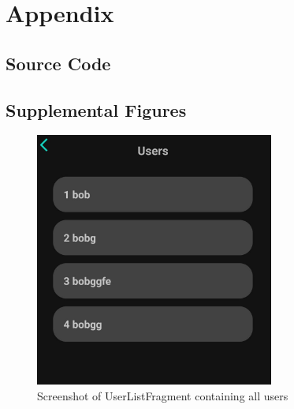 \appendix


\chapter{Appendix}


\section{Source Code}

\section{Supplemental Figures}
\begin{figure}[H]
    \centering
    \includegraphics[width=0.7\textwidth]{images/userlistfragment-screenshot.jpeg}
    \caption{Screenshot of UserListFragment containing all users}
    \label{fig:userlistfragment}
\end{figure}